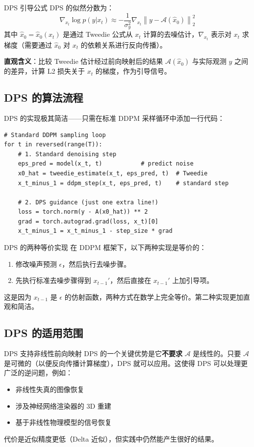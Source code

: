\documentclass[a4paper]{article}
\begin{document}
\begin{importantbox}{DPS 引导公式}
DPS 的似然分数为：
$$
\nabla_{x_t} \log p(y | x_t) \approx -\frac{1}{\sigma_y^2} \nabla_{x_t} \left\| y - \mathcal{A}(\hat{x}_0) \right\|_2^2
$$
其中 $\hat{x}_0 = \hat{x}_0(x_t)$ 是通过 Tweedie 公式从 $x_t$ 计算的去噪估计，$\nabla_{x_t}$ 表示对 $x_t$ 求梯度（需要通过 $\hat{x}_0$ 对 $x_t$ 的依赖关系进行反向传播）。

\textbf{直观含义}：比较 Tweedie 估计经过前向映射后的结果 $\mathcal{A}(\hat{x}_0)$ 与实际观测 $y$ 之间的差异，计算 L2 损失关于 $x_t$ 的梯度，作为引导信号。
\end{importantbox}

\subsection{DPS 的算法流程}

DPS 的实现极其简洁——只需在标准 DDPM 采样循环中添加一行代码：

\begin{lstlisting}[caption={DPS 引导的伪代码}]
# Standard DDPM sampling loop
for t in reversed(range(T)):
    # 1. Standard denoising step
    eps_pred = model(x_t, t)           # predict noise
    x0_hat = tweedie_estimate(x_t, eps_pred, t)  # Tweedie
    x_t_minus_1 = ddpm_step(x_t, eps_pred, t)    # standard step

    # 2. DPS guidance (just one extra line!)
    loss = torch.norm(y - A(x0_hat)) ** 2
    grad = torch.autograd.grad(loss, x_t)[0]
    x_t_minus_1 = x_t_minus_1 - step_size * grad
\end{lstlisting}

\begin{importantbox}{DPS 的两种等价实现}
在 DDPM 框架下，以下两种实现是等价的：
\begin{enumerate}
    \item 修改噪声预测 $\epsilon$，然后执行去噪步骤。
    \item 先执行标准去噪步骤得到 $x_{t-1}'$，然后直接在 $x_{t-1}'$ 上加引导项。
\end{enumerate}
这是因为 $x_{t-1}$ 是 $\epsilon$ 的仿射函数，两种方式在数学上完全等价。第二种实现更加直观和简洁。
\end{importantbox}

\subsection{DPS 的适用范围}

\begin{knowledgebox}{DPS 支持非线性前向映射}
DPS 的一个关键优势是它\textbf{不要求} $\mathcal{A}$ 是线性的。只要 $\mathcal{A}$ 是可微的（以便反向传播计算梯度），DPS 就可以应用。这使得 DPS 可以处理更广泛的逆问题，例如：
\begin{itemize}
    \item 非线性失真的图像恢复
    \item 涉及神经网络渲染器的 3D 重建
    \item 基于非线性物理模型的信号恢复
\end{itemize}
代价是近似精度更低（Delta 近似），但实践中仍然能产生很好的结果。
\end{knowledgebox}
\end{document}
